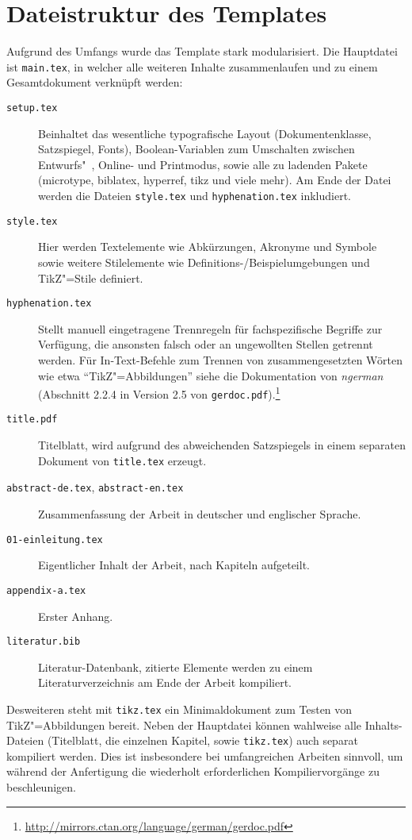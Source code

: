 \section{Dateistruktur des Templates}\label{sec:struktur}
%
Aufgrund des Umfangs wurde das Template stark modularisiert. Die Hauptdatei ist \texttt{main.tex}, in welcher alle weiteren Inhalte zusammenlaufen und zu einem Gesamtdokument verknüpft werden:
%
\begin{description}
  \item[\texttt{setup.tex}] Beinhaltet das wesentliche typografische Layout (Dokumentenklasse, Satzspiegel, Fonts), Boolean-Variablen zum Umschalten zwischen Entwurfs"~, Online- und Printmodus, sowie alle zu ladenden Pakete (microtype, biblatex, hyperref, tikz und viele mehr). Am Ende der Datei werden die Dateien \texttt{style.tex} und \texttt{hyphenation.tex} inkludiert.
  \item[\texttt{style.tex}] Hier werden Textelemente wie Abkürzungen, Akronyme und Symbole sowie weitere Stilelemente wie Definitions-/Beispielumgebungen und TikZ"=Stile definiert.
  \item[\texttt{hyphenation.tex}] Stellt manuell eingetragene Trennregeln für fachspezifische Begriffe zur Verfügung, die ansonsten falsch oder an ungewollten Stellen getrennt werden. Für In-Text-Befehle zum Trennen von zusammengesetzten Wörten wie etwa \enquote{TikZ"=Abbildungen} siehe die Dokumentation von \emph{ngerman} (Abschnitt 2.2.4 in Version 2.5 von \texttt{gerdoc.pdf}).\footnote{\url{http://mirrors.ctan.org/language/german/gerdoc.pdf}}
  \item[\texttt{title.pdf}] Titelblatt, wird aufgrund des abweichenden Satzspiegels in einem separaten Dokument von \texttt{title.tex} erzeugt.
  \item[\texttt{abstract-de.tex}, \texttt{abstract-en.tex}] Zusammenfassung der Arbeit in deutscher und englischer Sprache.
  \item[\texttt{01-einleitung.tex} \usw{}] Eigentlicher Inhalt der Arbeit, nach Kapiteln aufgeteilt.
  \item[\texttt{appendix-a.tex}] Erster Anhang.
  \item[\texttt{literatur.bib}] Literatur-Datenbank, zitierte Elemente werden zu einem Literaturverzeichnis am Ende der Arbeit kompiliert.
\end{description}
%
Desweiteren steht mit \texttt{tikz.tex} ein Minimaldokument zum Testen von TikZ"=Abbildungen bereit. Neben der Hauptdatei können wahlweise alle Inhalts-Dateien (Titelblatt, die einzelnen Kapitel, sowie \texttt{tikz.tex}) auch separat kompiliert werden. Dies ist insbesondere bei umfangreichen Arbeiten sinnvoll, um während der Anfertigung die wiederholt erforderlichen Kompiliervorgänge zu beschleunigen.
%
%

